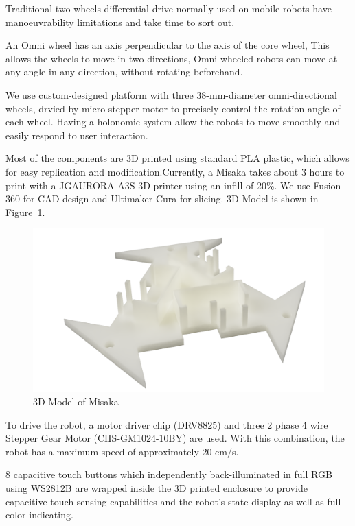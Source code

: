 \documentclass[conference]{IEEEtran}
\begin{document}
Traditional two wheels differential drive normally used on mobile robots have manoeuvrability limitations and take time to sort out\cite{ribeiro2004three}. 

An Omni wheel has an axis perpendicular to the axis of the core wheel, This allows the wheels to move in two directions, Omni-wheeled robots can move at any angle in any direction, without rotating beforehand.

We use custom-designed platform with three 38-mm-diameter omni-directional wheels, drvied by micro stepper motor to precisely control the rotation angle of each wheel. Having a holonomic system allow the robots to move smoothly and easily respond to user interaction.

Most of the components are 3D printed using standard PLA plastic, which allows for easy replication and modification.Currently, a Misaka takes about 3 hours to print with a JGAURORA A3S 3D printer using an infill of 20\%. We use Fusion 360 for CAD design and Ultimaker Cura for slicing. 3D Model is shown in Figure~\ref{fig:3DModel}.

\begin{figure}[htbp]
    \centering
    \includegraphics[width=\columnwidth]{3DModel.png}
    \caption{3D Model of Misaka}
    \label{fig:3DModel}
\end{figure}

To drive the robot, a motor driver chip (DRV8825) and three 2 phase 4 wire Stepper Gear Motor (CHS-GM1024-10BY) are used. With this combination, the robot has a maximum speed of approximately 20 cm/s.

8 capacitive touch buttons which independently back-illuminated in full RGB using WS2812B are wrapped inside the 3D printed enclosure to provide capacitive touch sensing capabilities and the robot’s state display as well as full color indicating.
\end{document}
